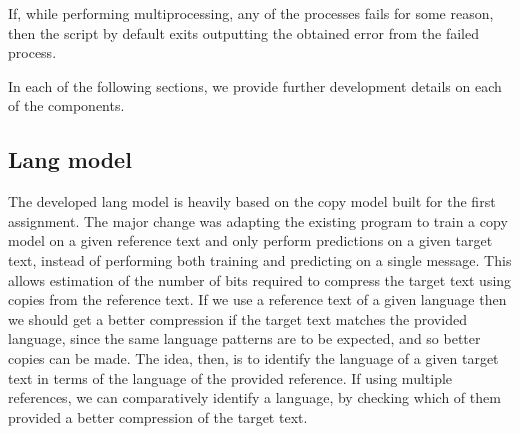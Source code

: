 \documentclass{article}
\begin{document}
If, while performing multiprocessing, any of the processes fails for some reason, then the script by default exits outputting the obtained error from the failed process.

In each of the following sections, we provide further development details on each of the components.

\subsection{Lang model}
\label{subsec:methodology_lang_model}

The developed lang model is heavily based on the copy model built for the first assignment.
The major change was adapting the existing program to train a copy model on a given reference text and only perform predictions on a given target text, instead of performing both training and predicting on a single message.
This allows estimation of the number of bits required to compress the target text using copies from the reference text.
If we use a reference text of a given language then we should get a better compression if the target text matches the provided language, since the same language patterns are to be expected, and so better copies can be made.
The idea, then, is to identify the language of a given target text in terms of the language of the provided reference.
If using multiple references, we can comparatively identify a language, by checking which of them provided a better compression of the target text.
\end{document}
